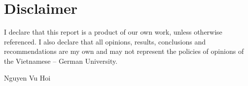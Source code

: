 \documentclass[pdftex,12pt,a4paper]{article}
\begin{document}
  
  
  
  \newpage
  \tableofcontents
  \newpage
  \listoffigures
  
  \setlength{\parindent}{0em}
  \setlength{\parskip}{1em}
  
  \newpage
  \section*{Disclaimer}
  I declare that this report is a product of our own work, unless otherwise referenced. I also declare that all opinions, results, conclusions and recommendations are my own and may not represent the policies of opinions of the Vietnamese – German University.~\\[4cm]
  \begin{flushright}
  Nguyen Vu Hoi
  \end{flushright}
  
  \newpage
\end{document}
